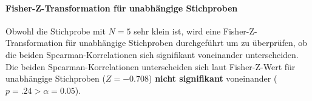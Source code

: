 \documentclass[a4paper,11pt]{article}%
\renewcommand{\\}{\vspace*{0.5\baselineskip} \newline}
\begin{document}
\paragraph{Fisher-Z-Transformation für unabhängige Stichproben}
Obwohl die Stichprobe mit $N=5$ sehr klein ist, wird eine Fisher-Z-Transformation für unabhängige Stichproben durchgeführt um zu überprüfen, ob die beiden Spearman-Korrelationen sich signifikant voneinander unterscheiden.
Die beiden Spearman-Korrelationen unterscheiden sich laut Fisher-Z-Wert für unabhängige Stichproben ($Z=-0.708$) \textbf{nicht signifikant} voneinander ($p = .24 > \alpha = 0.05$).
%
%
%
\end{document}
